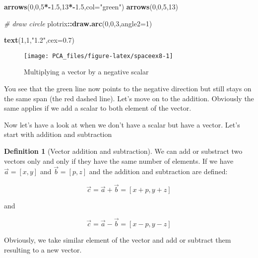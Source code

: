 \documentclass[
]{book}
\newenvironment{Shaded}{\begin{snugshade}}{\end{snugshade}}
\newcommand{\CommentTok}[1]{\textcolor[rgb]{0.56,0.35,0.01}{\textit{#1}}}
\newcommand{\DataTypeTok}[1]{\textcolor[rgb]{0.13,0.29,0.53}{#1}}
\newcommand{\DecValTok}[1]{\textcolor[rgb]{0.00,0.00,0.81}{#1}}
\newcommand{\FloatTok}[1]{\textcolor[rgb]{0.00,0.00,0.81}{#1}}
\newcommand{\KeywordTok}[1]{\textcolor[rgb]{0.13,0.29,0.53}{\textbf{#1}}}
\newcommand{\NormalTok}[1]{#1}
\newcommand{\OperatorTok}[1]{\textcolor[rgb]{0.81,0.36,0.00}{\textbf{#1}}}
\newcommand{\StringTok}[1]{\textcolor[rgb]{0.31,0.60,0.02}{#1}}
\theoremstyle{definition}
\newtheorem{definition}{Definition}[chapter]
\theoremstyle{definition}
\theoremstyle{definition}
\theoremstyle{remark}
\begin{document}
\begin{Shaded}
\begin{Highlighting}[]
\KeywordTok{arrows}\NormalTok{(}\DecValTok{0}\NormalTok{,}\DecValTok{0}\NormalTok{,}\DecValTok{5}\OperatorTok{*-}\FloatTok{1.5}\NormalTok{,}\DecValTok{13}\OperatorTok{*-}\FloatTok{1.5}\NormalTok{,}\DataTypeTok{col=}\StringTok{"green"}\NormalTok{)}
\KeywordTok{arrows}\NormalTok{(}\DecValTok{0}\NormalTok{,}\DecValTok{0}\NormalTok{,}\DecValTok{5}\NormalTok{,}\DecValTok{13}\NormalTok{)}

\CommentTok{# draw circle}
\NormalTok{plotrix}\OperatorTok{::}\KeywordTok{draw.arc}\NormalTok{(}\DecValTok{0}\NormalTok{,}\DecValTok{0}\NormalTok{,}\DecValTok{3}\NormalTok{,}\DataTypeTok{angle2=}\DecValTok{1}\NormalTok{)}

\KeywordTok{text}\NormalTok{(}\DecValTok{1}\NormalTok{,}\DecValTok{1}\NormalTok{,}\StringTok{"1.2"}\NormalTok{,}\DataTypeTok{cex=}\FloatTok{0.7}\NormalTok{)}
\end{Highlighting}
\end{Shaded}

\begin{figure}

{\centering \texttt{[image: PCA\_files/figure-latex/spaceex8-1]} 

}

\caption{Multiplying a vector by a negative scalar}\label{fig:spaceex8}
\end{figure}

You see that the green line now points to the negative direction but still stays on the same span (the red dashed line). Let's move on to the addition. Obviously the same applies if we add a scalar to both element of the vector.

Now let's have a look at when we don't have a scalar but have a vector. Let's start with addition and subtraction

\begin{definition}[Vector addition and subtraction]
\protect\hypertarget{def:vaddition}{}{\label{def:vaddition} \iffalse (Vector addition and subtraction) \fi{} }
We can add or substract two vectors only and only if they have the same number of elements. If we have \(\vec{a}=[x,y]\) and \(\vec{b}=[p,z]\) and the addition and subtraction are defined:

\[\vec{c}=\vec{a}+\vec{b}=[x+p, y+z]\]

and

\[\vec{c}=\vec{a}-\vec{b}=[x-p, y-z]\]

Obviously, we take similar element of the vector and add or subtract them resulting to a new vector.
\end{definition}
\end{document}
